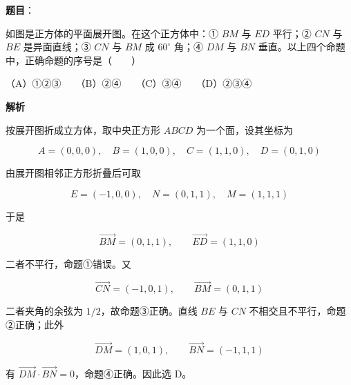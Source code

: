 \begin{answer}

\textbf{题目}：

如图是正方体的平面展开图。在这个正方体中：① $BM$ 与 $ED$ 平行；② $CN$ 与 $BE$ 是异面直线；③ $CN$ 与 $BM$ 成 $60^\circ$ 角；④ $DM$ 与 $BN$ 垂直。以上四个命题中，正确命题的序号是\mbox{（　　）}
\nopagebreak[4]
\begin{center}\end{center}
\nopagebreak[4]
（A）①②③　　（B）②④　　（C）③④　　（D）②③④

\textbf{解析}

按展开图折成立方体，取中央正方形 $ABCD$ 为一个面，设其坐标为

\nopagebreak[4]
\[
A=(0,0,0),\quad B=(1,0,0),\quad C=(1,1,0),\quad D=(0,1,0)
\]

由展开图相邻正方形折叠后可取

\nopagebreak[4]
\[
E=(-1,0,0),\quad N=(0,1,1),\quad M=(1,1,1)
\]

于是

\nopagebreak[4]
\[
\overrightarrow{BM}=(0,1,1),\qquad
\overrightarrow{ED}=(1,1,0)
\]

二者不平行，命题①错误。又

\nopagebreak[4]
\[
\overrightarrow{CN}=(-1,0,1),\qquad
\overrightarrow{BM}=(0,1,1)
\]

二者夹角的余弦为 $1/2$，故命题③正确。直线 $BE$ 与 $CN$ 不相交且不平行，命题②正确；此外

\nopagebreak[4]
\[
\overrightarrow{DM}=(1,0,1),\qquad
\overrightarrow{BN}=(-1,1,1)
\]

有 $\overrightarrow{DM}\cdot\overrightarrow{BN}=0$，命题④正确。因此选 D。


\end{answer}
